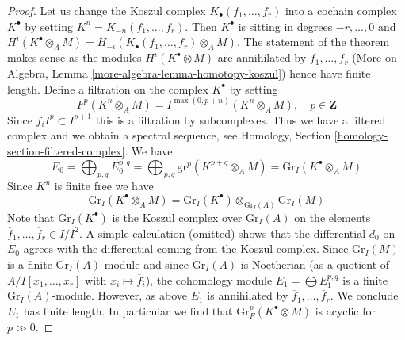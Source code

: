 \documentclass[10pt,a4paper]{amsart}
\theoremstyle{plain}
\theoremstyle{definition}
\theoremstyle{remark}
\numberwithin{equation}{subsection}
\begin{document}
\begin{proof}
Let us change the Koszul complex $K_\bullet(f_1, \ldots, f_r)$ into a cochain
complex $K^\bullet$ by setting $K^n = K_{-n}(f_1, \ldots, f_r)$.
Then $K^\bullet$ is sitting in degrees $-r, \ldots, 0$ and
$H^i(K^\bullet \otimes_A M) = H_{-i}(K_\bullet(f_1, \ldots, f_r) \otimes_A M)$.
The statement of the theorem makes sense as the modules
$H^i(K^\bullet \otimes M)$ are annihilated by $f_1, \ldots, f_r$
(More on Algebra, Lemma \ref{more-algebra-lemma-homotopy-koszul})
hence have finite length.
Define a filtration on the complex $K^\bullet$ by setting
$$
F^p(K^n \otimes_A M) =
I^{\max(0, p + n)}(K^n \otimes_A M),\quad p \in \mathbf{Z}
$$
Since $f_i I^p \subset I^{p + 1}$ this is a filtration by subcomplexes.
Thus we have a filtered complex and we obtain a spectral sequence, see
Homology, Section \ref{homology-section-filtered-complex}.
We have
$$
E_0 = \bigoplus\nolimits_{p, q} E_0^{p, q} =
\bigoplus\nolimits_{p, q} \text{gr}^p(K^{p + q} \otimes_A M) =
\text{Gr}_I(K^\bullet \otimes_A M)
$$
Since $K^n$ is finite free we have
$$
\text{Gr}_I(K^\bullet \otimes_A M) =
\text{Gr}_I(K^\bullet) \otimes_{\text{Gr}_I(A)} \text{Gr}_I(M)
$$
Note that $\text{Gr}_I(K^\bullet)$ is the Koszul
complex over $\text{Gr}_I(A)$ on the elements
$\overline{f}_1, \ldots, \overline{f}_r \in I/I^2$.
A simple calculation (omitted)
shows that the differential $d_0$ on $E_0$
agrees with the differential coming from the Koszul complex.
Since $\text{Gr}_I(M)$ is a finite $\text{Gr}_I(A)$-module
and since $\text{Gr}_I(A)$ is Noetherian (as a quotient
of $A/I[x_1, \ldots, x_r]$ with $x_i \mapsto \overline{f}_i$), the
cohomology module $E_1 = \bigoplus E_1^{p, q}$
is a finite $\text{Gr}_I(A)$-module. However, as above
$E_1$ is annihilated by $\overline{f}_1, \ldots, \overline{f}_r$.
We conclude $E_1$ has finite length.
In particular we find that $\text{Gr}^p_F(K^\bullet \otimes M)$ is
acyclic for $p \gg 0$.


\end{proof}
\end{document}
